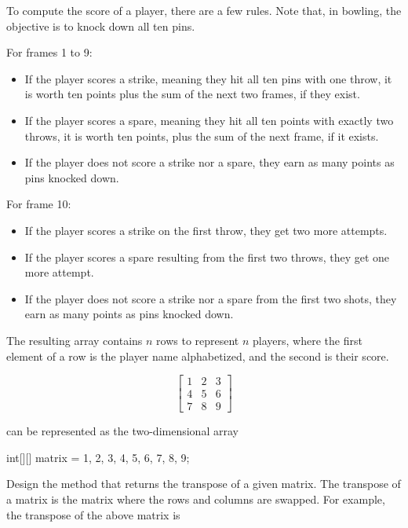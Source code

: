 To compute the score of a player, there are a few rules. Note that, in bowling, the objective is to knock down all ten pins.

For frames 1 to 9:
\begin{itemize}
    \item If the player scores a strike, meaning they hit all ten pins with one throw, it is worth ten points plus the sum of the next two frames, if they exist.
    \item If the player scores a spare, meaning they hit all ten points with exactly two throws, it is worth ten points, plus the sum of the next frame, if it exists.
    \item If the player does not score a strike nor a spare, they earn as many points as pins knocked down.
\end{itemize}

For frame 10:
\begin{itemize}
    \item If the player scores a strike on the first throw, they get two more attempts.
    \item If the player scores a spare resulting from the first two throws, they get one more attempt.
    \item If the player does not score a strike nor a spare from the first two shots, they earn as many points as pins knocked down.
\end{itemize}

The resulting array contains $n$ rows to represent $n$ players, where the first element of a row is the player name alphabetized, and the second is their score.


\[
\begin{bmatrix}
    1 & 2 & 3\\
    4 & 5 & 6\\
    7 & 8 & 9
\end{bmatrix}
\]

\noindent can be represented as the two-dimensional array

\begin{verbnobox}[\small]
int[][] matrix = {{1, 2, 3}, {4, 5, 6}, {7, 8, 9}};
\end{verbnobox}

\noindent Design the  method that returns the transpose of a given matrix. The transpose of a matrix is the matrix where the rows and columns are swapped. For example, the transpose of the above matrix is

